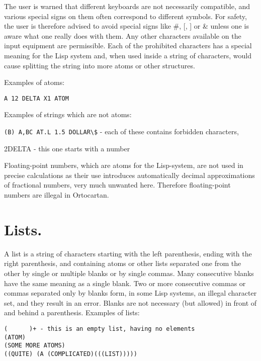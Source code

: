 \bigskip

The user is warned that different keyboards are not necessarily compatible, and
various  special  signs  on  them
     often correspond to different symbols. For safety, the  user
     is  therefore advised to avoid special signs like \#, [, ] or
     \& unless one is aware what one really does  with  them.  Any
other  characters  available on the input equipment are permissible. Each of
the prohibited characters  has  a  special
     meaning  for  the Lisp system and, when used inside a string
     of characters, would cause splitting the  string  into  more
     atoms or other structures.

Examples of atoms:

\bigskip

\verb+A 12 DELTA X1 ATOM+

\bigskip

Examples of strings which are not atoms:

\bigskip

\verb+(B) A,BC AT.L 1.5 DOLLAR\$+ - each of these contains forbidden
characters,

\bigskip

     2DELTA - this one starts with a number

\bigskip

Floating-point  numbers,  which  are  atoms   for   the
     Lisp-system,  are  not used in precise calculations as their
use introduces automatically decimal approximations of fractional numbers, very
much unwanted here. Therefore floating-point numbers are illegal in Ortocartan.

\section{Lists.}

A list is a string of characters starting with the left
     parenthesis, ending with the right parenthesis, and containing
     atoms or other lists separated one from the other by  single
     or  multiple  blanks  or  by single commas. Many consecutive
     blanks have the same meaning as a single blank. Two or  more
     consecutive  commas or commas separated only by blanks form,
in some Lisp systems, an illegal character set, and they result in an error.
Blanks  are  not necessary (but allowed) in front of
     and behind a parenthesis. Examples of lists:

\begin{verbatim}
(      )+ - this is an empty list, having no elements
(ATOM)
(SOME MORE ATOMS)
((QUITE) (A (COMPLICATED)(((LIST)))))
\end{verbatim}

